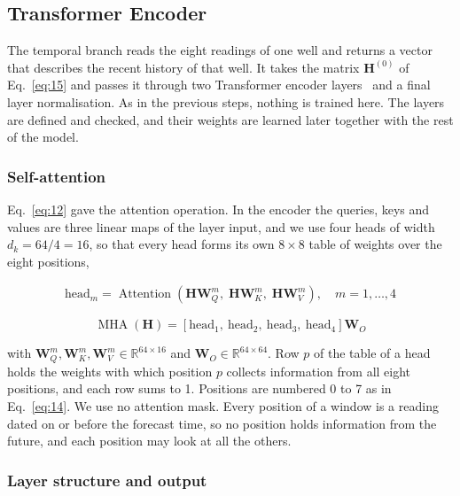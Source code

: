 \documentclass[conference]{IEEEtran}
\begin{document}
\subsection{Transformer Encoder}

The temporal branch reads the eight readings of one well and returns a vector that describes the recent history of that well. It takes the matrix \(\mathbf{H}^{(0)}\) of Eq.~\eqref{eq:15} and passes it through two Transformer encoder layers~\cite{ref22} and a final layer normalisation. As in the previous steps, nothing is trained here. The layers are defined and checked, and their weights are learned later together with the rest of the model.

\subsubsection{Self-attention}

Eq.~\eqref{eq:12} gave the attention operation. In the encoder the queries, keys and values are three linear maps of the layer input, and we use four heads of width \(d_k = 64/4 = 16\), so that every head forms its own \(8 \times 8\) table of weights over the eight positions,

\begin{equation}
\begin{gathered}
\mathrm{head}_m = \operatorname{Attention}\!\left(\mathbf{H}\mathbf{W}_Q^{m},\; \mathbf{H}\mathbf{W}_K^{m},\; \mathbf{H}\mathbf{W}_V^{m}\right), \quad m = 1,\dots,4
\end{gathered}\label{eq:19}
\end{equation}

\begin{equation}
\operatorname{MHA}(\mathbf{H}) = \left[\mathrm{head}_1,\ \mathrm{head}_2,\ \mathrm{head}_3,\ \mathrm{head}_4\right]\mathbf{W}_O\label{eq:20}
\end{equation}

with \(\mathbf{W}_Q^{m}, \mathbf{W}_K^{m}, \mathbf{W}_V^{m} \in \mathbb{R}^{64 \times 16}\) and \(\mathbf{W}_O \in \mathbb{R}^{64 \times 64}\). Row \(p\) of the table of a head holds the weights with which position \(p\) collects information from all eight positions, and each row sums to 1. Positions are numbered 0 to 7 as in Eq.~\eqref{eq:14}. We use no attention mask. Every position of a window is a reading dated on or before the forecast time, so no position holds information from the future, and each position may look at all the others.

\subsubsection{Layer structure and output}
\end{document}
